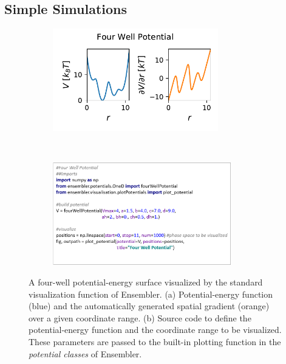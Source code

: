 \subsection{Simple Simulations}



\begin{figure}[H]
	\centering
	\begin{subfigure}{0.85\textwidth}
		\includegraphics[width=\linewidth, height=1.75in]{fig/codeExamples/four_well.pdf} 
		\caption{}
	\end{subfigure}\\
	\begin{subfigure}{0.85\textwidth}
		\includegraphics[width=\linewidth, height=1.75in]{fig/codeExamples/Potential_code.png}
		\caption{}
	\end{subfigure}
	\caption{A four-well potential-energy surface visualized by the standard visualization function of Ensembler. (a) Potential-energy function (blue) and the automatically generated spatial gradient (orange) over a given coordinate range. (b) Source code to define the potential-energy function and the coordinate range to be visualized. These parameters are passed to the built-in plotting function in the \textit{potential classes} of Ensembler.}
	\label{fig:code_example_potential}
\end{figure}



